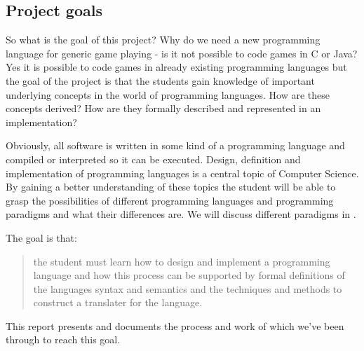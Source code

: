\subsection{Project goals}
\label{projectgoals}

So what is the goal of this project? Why do we need a new programming language for generic game playing - is it not possible to code games in C or Java? Yes it is possible to code games in already existing programming languages but the goal of the project is that the students gain knowledge of important underlying concepts in the world of programming languages. How are these concepts derived? How are they formally described and represented in an implementation? 

Obviously, all software is written in some kind of a programming language and compiled or interpreted so it can be executed. Design, definition and implementation of programming languages is a central topic of Computer Science. By gaining a better understanding of these topics the student will be able to grasp the possibilities of different programming languages and programming paradigms and what their differences are.\cite[p. 22]{dat-stud-ordning} We will discuss different paradigms in . 

The goal is that:

\begin{quote}
the student must learn how to design and implement a programming language and how this process can be supported by formal definitions of the languages syntax and semantics and the techniques and methods to construct a translater for the language.\cite[p. 22]{dat-stud-ordning}
\end{quote}

This report presents and documents the process and work of which we've been through to reach this goal.